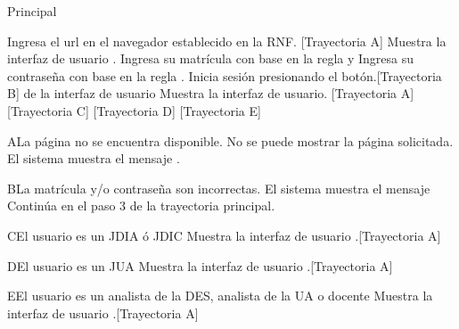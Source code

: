 \begin{UCtrayectoria}{Principal}
    
    \UCpaso[\UCactor] Ingresa el url en el navegador establecido en la RNF. [Trayectoria A] 
    \UCpaso Muestra la interfaz de usuario .
    \UCpaso[\UCactor] Ingresa su matrícula con base en la regla  y  
    \UCpaso[\UCactor] Ingresa su contraseña con base en la regla .
    \UCpaso[\UCactor] Inicia sesión presionando el botón.[Trayectoria B]
     de la interfaz de usuario 
    \UCpaso[\UCactor] Muestra la interfaz de usuario. [Trayectoria A][Trayectoria C] [Trayectoria D] [Trayectoria E]
\end{UCtrayectoria}


\begin{UCtrayectoriaA}{A}{La página no se encuentra disponible.}
	\UCpaso No se puede mostrar la página solicitada.
    \UCpaso El sistema muestra el mensaje .
\end{UCtrayectoriaA}


\begin{UCtrayectoriaA}{B}{La matrícula y/o contraseña son incorrectas.}
    \UCpaso El sistema muestra el mensaje 
    \UCpaso Continúa en el paso 3 de la trayectoria principal.
\end{UCtrayectoriaA}



\begin{UCtrayectoriaA}{C}{El usuario es un JDIA ó JDIC}
    \UCpaso Muestra la interfaz de usuario .[Trayectoria A]
\end{UCtrayectoriaA}


\begin{UCtrayectoriaA}{D}{El usuario es un JUA}
    \UCpaso Muestra la interfaz de usuario .[Trayectoria A]
\end{UCtrayectoriaA}


\begin{UCtrayectoriaA}{E}{El usuario es un analista de la DES, analista de la UA o docente}
    \UCpaso Muestra la interfaz de usuario .[Trayectoria A]
\end{UCtrayectoriaA}

